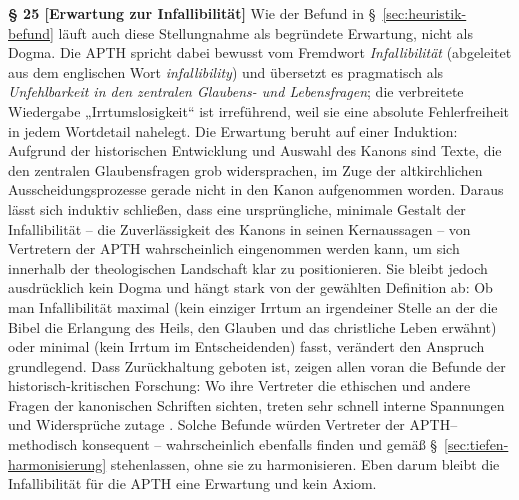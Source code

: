 \documentclass[11pt,a4paper]{article}
\makeatletter
\newcommand{\apth}{{\apthfont APTH}\hspace{0.15em}\xspace}
\newcommand{\apthsec}[3]{%
  \phantomsection%
  \def\@currentlabel{#1}%
  \label{sec:#3}%
  \textbf{§ #1 [#2]}%
}
\makeatother
\begin{document}
\apthsec{25}{Erwartung zur Infallibilität}{infallibilitaet} Wie der Befund in §~\ref{sec:heuristik-befund} läuft auch diese Stellungnahme als begründete Erwartung, nicht als Dogma. Die \apth spricht dabei bewusst vom Fremdwort \textit{Infallibilität} (abgeleitet aus dem englischen Wort \textit{infallibility}) und übersetzt es pragmatisch als \textit{Unfehlbarkeit in den zentralen Glaubens- und Lebensfragen}; die verbreitete Wiedergabe „Irrtumslosigkeit“ ist irreführend, weil sie eine absolute Fehlerfreiheit in jedem Wortdetail nahelegt. Die Erwartung beruht auf einer Induktion: Aufgrund der historischen Entwicklung und Auswahl des Kanons sind Texte, die den zentralen Glaubensfragen grob widersprachen, im Zuge der altkirchlichen Ausscheidungsprozesse gerade nicht in den Kanon aufgenommen worden. Daraus lässt sich induktiv schließen, dass eine ursprüngliche, minimale Gestalt der Infallibilität – die Zuverlässigkeit des Kanons in seinen Kernaussagen – von Vertretern der \apth wahrscheinlich eingenommen werden kann, um sich innerhalb der theologischen Landschaft klar zu positionieren. Sie bleibt jedoch ausdrücklich kein Dogma und hängt stark von der gewählten Definition ab: Ob man Infallibilität maximal (kein einziger Irrtum an irgendeiner Stelle an der die Bibel die Erlangung des Heils, den Glauben und das christliche Leben erwähnt) oder minimal (kein Irrtum im Entscheidenden) fasst, verändert den Anspruch grundlegend. Dass Zurückhaltung geboten ist, zeigen allen voran die Befunde der historisch-kritischen Forschung: Wo ihre Vertreter die ethischen und andere Fragen der kanonischen Schriften sichten, treten sehr schnell interne Spannungen und Widersprüche zutage \citep{dunn1977,kaesemann1951,ehrman2009}. Solche Befunde würden Vertreter der \apth – methodisch konsequent – wahrscheinlich ebenfalls finden und gemäß §~\ref{sec:tiefen-harmonisierung} stehenlassen, ohne sie zu harmonisieren. Eben darum bleibt die Infallibilität für die \apth eine Erwartung und kein Axiom.
\end{document}
